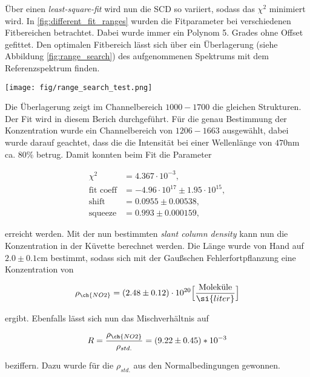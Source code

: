 \documentclass[12pt, a4paper, bibliography=totoc]{scrartcl}
\begin{document}
\begin{multicols}{2}
Über einen \textit{least-square-fit} wird nun die SCD so variiert, sodass das $\chi^2$ minimiert wird. In \ref{fig:different_fit_ranges} wurden die Fitparameter bei verschiedenen Fitbereichen betrachtet. Dabei wurde immer ein Polynom 5. Grades ohne Offset gefittet.
Den optimalen Fitbereich lässt sich über ein Überlagerung (siehe Abbildung \ref{fig:range_search}) des aufgenommenen Spektrums mit dem  Referenzspektrum finden.

\begin{center}
	\texttt{[image: fig/range\_search\_test.png]}
	\label{fig:range_search}
\end{center}

Die Überlagerung zeigt im Channelbereich $1000-1700$ die gleichen Strukturen. Der Fit wird in diesem Berich durchgeführt.
Für die genau Bestimmung der  Konzentration wurde ein Channelbereich von $1206-1663$ ausgewählt, dabei wurde darauf geachtet, dass die die Intensität bei einer Wellenlänge von $470$\si{nm} ca. $80$\% betrug.
Damit konnten beim Fit die Parameter

\begin{align}
	\chi^2 &= 4.367 \cdot 10^{-3},\\
    \text{fit coeff} &= -4.96 \cdot 10^{17} \pm 1.95 \cdot 10^{15},\\
    \text{shift} &= 0.0955 \pm 0.00538,\\
    \text{squeeze} &= 0.993 \pm 0.000159, 
\end{align}

erreicht werden.
Mit der nun bestimmten \textit{slant column density} kann nun die  Konzentration in der Küvette berechnet werden.
Die Länge wurde von Hand auf $2.0 \pm 0.1$\si{cm} bestimmt, sodass sich mit der Gaußschen Fehlerfortpflanzung eine Konzentration von

\begin{align}
	\rho_{\ch{NO2}} = (2.48 \pm 0.12) \cdot 10^{20} \Bigl[ \frac{\text{Moleküle}}{\si{liter}}\Bigr]
\end{align}

ergibt.	
Ebenfalls lässt sich nun das Mischverhältnis auf

\begin{align}
	R = \frac{\rho_{\ch{NO2}}}{\rho_{std.}} = (9.22 \pm 0.45) *10^{-3}
\end{align}

beziffern. Dazu wurde für die $\rho_{std.}$ aus den Normalbedingungen gewonnen.


\end{multicols}
\end{document}
